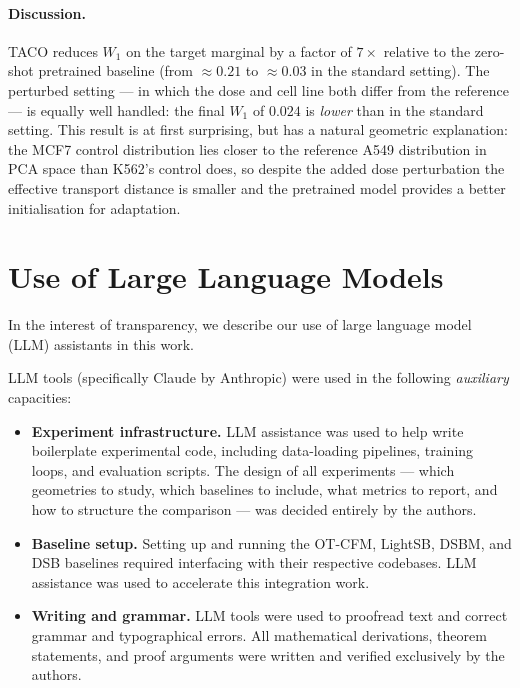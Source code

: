 \documentclass[11pt]{article}
\theoremstyle{definition}
\numberwithin{equation}{section}%
\begin{document}
\paragraph{Discussion.}
TACO reduces $W_1$ on the target marginal by a factor of $7\times$ relative to the zero-shot pretrained baseline (from $\approx 0.21$ to $\approx 0.03$ in the standard setting).
The perturbed setting — in which the dose and cell line both differ from the reference — is equally well handled: the final $W_1$ of $0.024$ is \emph{lower} than in the standard setting.
This result is at first surprising, but has a natural geometric explanation: the MCF7 control distribution lies closer to the reference A549 distribution in PCA space than K562's control does, so despite the added dose perturbation the effective transport distance is smaller and the pretrained model provides a better initialisation for adaptation.

\section{Use of Large Language Models}
\label{app:llm}

In the interest of transparency, we describe our use of large language model (LLM) assistants in this work.

LLM tools (specifically Claude by Anthropic) were used in the following \emph{auxiliary} capacities:
\begin{itemize}[noitemsep, topsep=3pt]
  \item \textbf{Experiment infrastructure.}
        LLM assistance was used to help write boilerplate experimental code, including data-loading pipelines, training loops, and evaluation scripts.
        The design of all experiments --- which geometries to study, which baselines to include, what metrics to report, and how to structure the comparison --- was decided entirely by the authors.
  \item \textbf{Baseline setup.}
        Setting up and running the OT-CFM, LightSB, DSBM, and DSB baselines required interfacing with their respective codebases. LLM assistance was used to accelerate this integration work.
  \item \textbf{Writing and grammar.}
        LLM tools were used to proofread text and correct grammar and typographical errors.
        All mathematical derivations, theorem statements, and proof arguments were written and verified exclusively by the authors.
\end{itemize}
\end{document}

